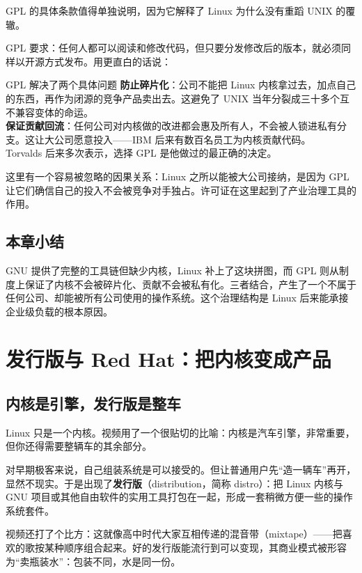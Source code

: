 \documentclass[a4paper]{article}
\begin{document}
GPL 的具体条款值得单独说明，因为它解释了 Linux 为什么没有重蹈 UNIX 的覆辙。

GPL 要求：任何人都可以阅读和修改代码，但只要分发修改后的版本，就必须同样以开源方式发布。用更直白的话说：

\begin{importantbox}{GPL 解决了两个具体问题}
\textbf{防止碎片化}：公司不能把 Linux 内核拿过去，加点自己的东西，再作为闭源的竞争产品卖出去。这避免了 UNIX 当年分裂成三十多个互不兼容变体的命运。\\
\textbf{保证贡献回流}：任何公司对内核做的改进都会惠及所有人，不会被人锁进私有分支。这让大公司愿意投入——IBM 后来有数百名员工为内核贡献代码。\\
Torvalds 后来多次表示，选择 GPL 是他做过的最正确的决定。
\end{importantbox}

这里有一个容易被忽略的因果关系：Linux 之所以能被大公司接纳，是因为 GPL 让它们确信自己的投入不会被竞争对手独占。许可证在这里起到了产业治理工具的作用。

\subsection{本章小结}
GNU 提供了完整的工具链但缺少内核，Linux 补上了这块拼图，而 GPL 则从制度上保证了内核不会被碎片化、贡献不会被私有化。三者结合，产生了一个不属于任何公司、却能被所有公司使用的操作系统。这个治理结构是 Linux 后来能承接企业级负载的根本原因。

\section{发行版与 Red Hat：把内核变成产品}

\subsection{内核是引擎，发行版是整车}

Linux 只是一个内核。视频用了一个很贴切的比喻：内核是汽车引擎，非常重要，但你还得需要整辆车的其余部分。

对早期极客来说，自己组装系统是可以接受的。但让普通用户先“造一辆车”再开，显然不现实。于是出现了\textbf{发行版}（distribution，简称 distro）：把 Linux 内核与 GNU 项目或其他自由软件的实用工具打包在一起，形成一套稍微方便一些的操作系统套件。

视频还打了个比方：这就像高中时代大家互相传递的混音带（mixtape）——把喜欢的歌按某种顺序组合起来。好的发行版能流行到可以变现，其商业模式被形容为“卖瓶装水”：包装不同，水是同一份。
\end{document}
